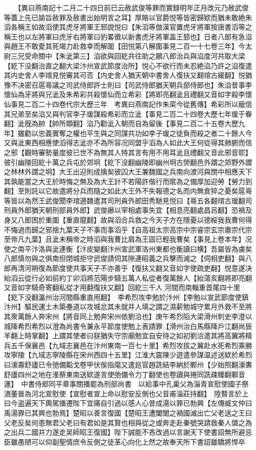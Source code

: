 　　【異曰燕南記十二月二十四日前已云赦武俊等罪而實録明年正月改元乃赦武俊等蓋上先已諭旨赦罪及赦書出始明言之耳】厚賂以官爵悦等皆密歸欵而猶未敢絶朱滔各稱王如故滔使其虎牙將軍王郅說悦曰【朱滔等倣漢官置虎牙將軍按唐書滔等之稱王也以左將軍曰虎牙右將軍曰豹畧徵以新書虎牙將軍盖王郅也】日者八郎有急淊與趙王不敢愛其死竭力赴救幸而解圍【田悦第八解圍事見二百一十七卷三年】今太尉三兄受命關中【朱泚第三】淊欲與回紇共往助之願八郎治兵與淊度河共取大梁【紇下没翻治直之翻大梁汴州宣武節度治所】悦心不欲行而未忍絶淊乃許之淊復遣其内史舍人李琯見悦審其可否【内史舍人猶天朝中書舍人復扶又翻琯古緩翻】悦猶豫不决密召扈㠋議之司武侍郎許士則曰【司武侍郎猶天朝兵部侍郎也】朱淊昔事李懷仙為牙將與兄泚及朱希彩共殺懷仙而立希彩【將即亮翻泚且禮翻又音如字殺李懷仙事見二百二十四卷代宗大歷三年　考異曰燕南記作朱寀今從舊傳】希彩所以寵信其兄弟至矣淊又與判官李子瑗謀殺希彩而立泚【事見二百二十四卷大歷七年瑗于眷翻】泚旣為帥【帥所類翻】淊乃勸泚入朝而自為留後【事見二百二十五卷大歷九年】雖勸以忠義實奪之權也平生與之同謀共功如李子瑗之徒負而殺之者二十餘人今又與泚東西相應使滔得志泚亦不為所容况同盟乎滔為人如此大王何從得其肺腑而信之邪【觀時審勢量度彼已世不為無其人特其言有用不用耳泚且禮翻又音此邪音耶】彼引幽陵回紇十萬之兵屯於郊坰【紇下没翻幽陵即幽州坰古熒翻邑外謂之郊野外謂之林林外謂之坰】大王出迎則成擒矣彼囚大王兼魏國之兵南向渡河與關中相應天下其孰能當之大王於時悔之無及為大王計不若陽許偕行而隂為之備厚加迎勞【勞力到翻】至則託以它故遣將分兵而隨之如此大王外不失報德之名而内無倉猝之憂矣扈㠋等皆以為然王武俊聞李琯適魏遣其司刑員外郎田秀馳見悦曰【㠋五各翻琯古瑗翻司刑員外郎猶天朝刑部員外郎】武俊曏以宰相處事失宜【相息亮翻處昌呂翻】恐禍及身又八郎困於重圍【重直龍翻】故與滔合兵救之今天子方在隱憂以德綏我我曹何得不悔過而歸之邪捨九葉天子不事而事滔乎【自高祖太宗高宗中宗睿宗玄宗肅宗代宗至帝凡九葉】且泚未稱帝之時滔與我曹比肩為王固已輕我曹矣【事見上卷本年】况使之南平汴洛與泚連衡【汴皮變翻汴州宣武軍洛州東都也衡讀曰横】吾屬皆為虜矣八郎慎勿與之俱南但閉城拒守武俊請伺其隙連昭義之兵擊而滅之【伺相吏翻】與八郎再清河朔復為節度使共事天子不亦善乎【復扶又翻又音如字使疏吏翻】悦意遂决紿滔云從行必如前約丁卯滔將范陽步騎五萬人私從者復萬餘人【紿蕩亥翻將即亮翻又音如字騎奇寄翻私從才用翻復扶又翻】回紇三千人河間而南輜重首尾四十里【紇下没翻瀛州治河間縣重直用翻】　李希烈攻李勉於汴州【李勉以宣武節度使鎮汴州】驅民運土木築壘道以攻城忿其未就并人填之謂之濕薪勉城守累月外救不至將其衆萬餘人奔宋州【將音同上勉奔宋州依劉洽也】庚午希烈䧟大梁滑州刺史李澄以城降希烈希烈以澄為尚書令兼永平節度使勉上表請罪【滑州治白馬縣降戶江翻尚辰羊翻上時掌翻】上謂其使者曰朕猶失守宗廟勉宜自安待之如初劉洽遣其將高翼將精兵五千保襄邑【九域志襄邑在汴州東南一百七十里】希烈攻拔之翼赴水死希烈乘勝攻寧陵【九域志寧陵縣在宋州西四十五里】江淮大震陳少遊遣參謀温述送欵於希烈曰濠壽舒廬已令弛備韜戈卷甲伏俟指麾又遣廵官趙詵結李納於鄆州【少始照翻濠夀舒廬四州之地在淮蔡東南送欵遂言使弛備令力丁翻使也卷讀與捲同詵疎臻翻鄆音運】　中書侍郎同平章事關播罷為刑部尚書　以給事中孔巢父為淄青宣慰使國子祭酒董晉為河北宣慰使【宣慰者宣上命以慰安反側也父音甫淄莊持翻】　陸䞇言於上曰今盗遍天下輿駕播遷陛下宜痛自引過以感人心昔成湯以罪已勃興【左傳臧文仲曰禹湯罪已其興也勃焉】楚昭以善言復國【楚昭王遭闔閭之禍國滅出亡父老送之王曰父老反矣何患無君父老曰有君如是其賢也相與從之或奔走赴秦號哭請救秦人憐之為之出兵二國并力遂走吴師昭王復國】陛下誠能不吝改過以言謝天下使書詔無所避忌臣雖愚陋可以仰副聖情庶令反側之徒革心向化上然之故奉天所下書詔雖驕將悍卒